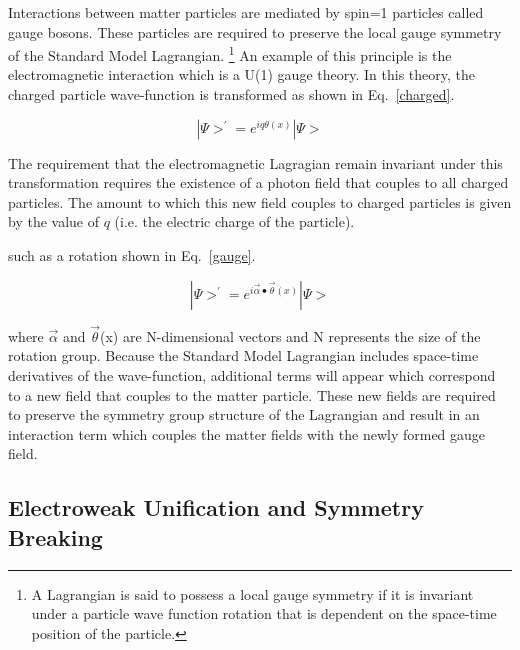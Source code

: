 Interactions between matter particles are mediated by spin=1 particles called gauge bosons. These particles are required to preserve the local gauge symmetry of the Standard Model Lagrangian. \footnote{A Lagrangian is said to possess a local gauge symmetry if it is invariant under a particle wave function rotation that is dependent on the space-time position of the particle.} An example of this principle is the electromagnetic interaction which is a U(1) gauge theory. In this theory, the charged particle wave-function is transformed as shown in Eq.~\ref{charged}.

\begin{equation} 
\label{charged}
|\Psi>^{'} = e^{iq\theta(x)}|\Psi>
\end{equation}

The requirement that the electromagnetic Lagragian remain invariant under this transformation requires the existence of a photon field that couples to all charged particles. The amount to which this new field couples to charged particles is given by the value of $q$ (i.e. the electric charge of the particle).

  such as a rotation shown in Eq.~\ref{gauge}.

\begin{equation}
\label{gauge}
|\Psi>^{'} = e^{i\vec{\alpha} \bullet \vec{\theta}(x)}|\Psi>
\end{equation}

where $\vec{\alpha}$ and $\vec{\theta}$(x) are N-dimensional vectors and N represents the size of the rotation group. Because the Standard Model Lagrangian includes space-time derivatives of the wave-function, additional terms will appear which correspond to a new field that couples to the matter particle. These new fields are required to preserve the symmetry group structure of the Lagrangian and result in an interaction term which couples the matter fields with the newly formed gauge field.

\subsection{Electroweak Unification and Symmetry Breaking}
\label{electroweak}

